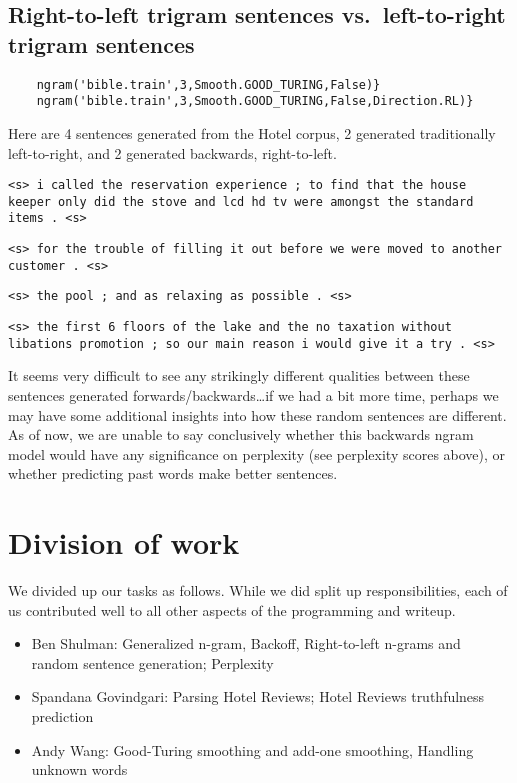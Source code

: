 \documentclass{article}
\begin{document}
\subsection{Right-to-left trigram sentences vs.\ left-to-right trigram sentences}
\begin{verbatim}
    ngram('bible.train',3,Smooth.GOOD_TURING,False)}
    ngram('bible.train',3,Smooth.GOOD_TURING,False,Direction.RL)}
\end{verbatim}

\begin{adjustwidth}{0.25in}{0.5in}
Here are 4 sentences generated from the Hotel corpus, 2 generated traditionally left-to-right, and 2 generated backwards, right-to-left.\par
{\small
\texttt{<s> i called the reservation experience ; to find that the house keeper only did the stove and lcd hd tv were amongst the standard items . <s>}\par
\texttt{<s> for the trouble of filling it out before we were moved to another customer . <s>}\par\smallskip
\texttt{<s> the pool ; and as relaxing as possible . <s>}\par
\texttt{<s> the first 6 floors of the lake and the no taxation without libations promotion ; so our main reason i would give it a try . <s>}
}\par
It seems very difficult to see any strikingly different qualities between these sentences generated forwards/backwards\ldots if we had a bit more time, perhaps we may have some additional insights into how these random sentences are different. As of now, we are unable to say conclusively whether this backwards ngram model would have any significance on perplexity (see perplexity scores above), or whether predicting past words make better sentences.
\end{adjustwidth}

\section{Division of work}
We divided up our tasks as follows. While we did split up responsibilities, each of us contributed well to all other aspects of the programming and writeup.

\begin{itemize}[noitemsep]
\item Ben Shulman: Generalized n-gram, Backoff, Right-to-left n-grams and random sentence generation; Perplexity
\item Spandana Govindgari: Parsing Hotel Reviews; Hotel Reviews truthfulness prediction
\item Andy Wang: Good-Turing smoothing and add-one smoothing, Handling unknown words
\end{itemize}
\end{document}
